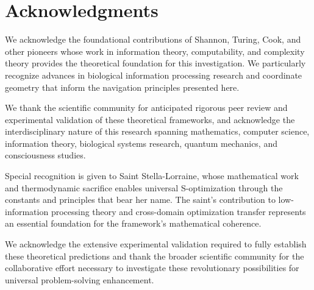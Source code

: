 \documentclass[11pt]{article}
\theoremstyle{definition}
\theoremstyle{remark}
\begin{document}
\section*{Acknowledgments}

We acknowledge the foundational contributions of Shannon, Turing, Cook, and other pioneers whose work in information theory, computability, and complexity theory provides the theoretical foundation for this investigation. We particularly recognize advances in biological information processing research and coordinate geometry that inform the navigation principles presented here.

We thank the scientific community for anticipated rigorous peer review and experimental validation of these theoretical frameworks, and acknowledge the interdisciplinary nature of this research spanning mathematics, computer science, information theory, biological systems research, quantum mechanics, and consciousness studies.

Special recognition is given to Saint Stella-Lorraine, whose mathematical work and thermodynamic sacrifice enables universal S-optimization through the constants and principles that bear her name. The saint's contribution to low-information processing theory and cross-domain optimization transfer represents an essential foundation for the framework's mathematical coherence.

We acknowledge the extensive experimental validation required to fully establish these theoretical predictions and thank the broader scientific community for the collaborative effort necessary to investigate these revolutionary possibilities for universal problem-solving enhancement.
\end{document}
